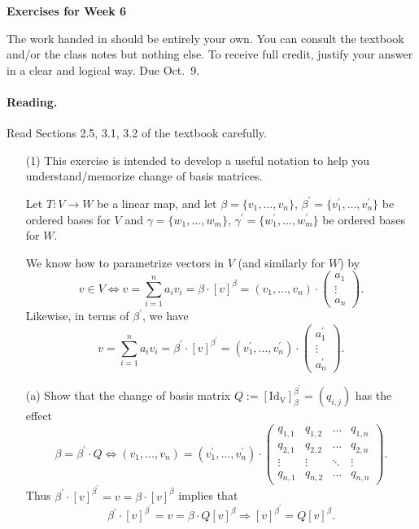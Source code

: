 \documentclass[11pt]{article}
\theoremstyle{plain}
\theoremstyle{definition}
\def\lra{\longrightarrow}
\begin{document}
\begin{center}
{\Large \bf Exercises for Week 6}
\end{center}
The work handed in should be entirely your own. You can consult the textbook and/or the class notes but nothing else. To receive full credit, justify your answer in a clear and logical way. Due Oct.~9.

\paragraph{Reading.} Read Sections 2.5, 3.1, 3.2 of the textbook carefully.

\begin{enumerate}
\item[(1)] This exercise is intended to develop a useful notation to help you understand/memorize change of basis matrices.

Let $T:V\lra W$ be a linear map, and let $\beta=\{v_1,\dots, v_n\}$, $\beta^\prime=\{v_1^\prime,\dots, v_n^\prime\}$ be ordered bases for $V$ and $\gamma=\{w_1,\dots, w_m\}$, $\gamma^\prime=\{w_1^\prime,\dots, w_m^\prime\}$ be ordered bases for $W$.

We know how to parametrize vectors in $V$ (and similarly for $W$) by
\[
v\in V \Longleftrightarrow v=\sum_{i=1}^n a_iv_i = \beta \cdot [v]^{\beta}= (v_1,\dots, v_n) \cdot
\left( 
\begin{matrix}
a_1\\
\vdots\\
a_n
\end{matrix}
\right).
\]
Likewise, in terms of $\beta^\prime$, we have
\[
 v=\sum_{i=1}^n a_iv_i = \beta^\prime \cdot [v]^{\beta^\prime}= (v_1^\prime,\dots, v_n^\prime) \cdot
\left( 
\begin{matrix}
a_1^\prime\\
\vdots\\
a_n^\prime
\end{matrix}
\right).
\]

(a) Show that the change of basis matrix $Q:= [\mathrm{Id_V}]_\beta^{\beta^\prime}=(q_{i,j})$ has the effect
\[
\beta = \beta^\prime\cdot Q \Longleftrightarrow
(v_1,\dots, v_n)= (v_1^\prime,\dots, v_n^\prime) \cdot
\left( 
\begin{matrix}
q_{1,1} & q_{1,2} &\dots & q_{1,n}\\
q_{2,1} & q_{2,2} &\dots & q_{2,n}\\
\vdots & \vdots &\ddots & \vdots\\
q_{n,1} & q_{n,2} &\dots & q_{n,n}
\end{matrix}
\right).
\]
Thus $\beta^\prime \cdot [v]^{\beta^\prime} = v = \beta \cdot [v]^\beta$ implies that
\[
\beta^\prime \cdot [v]^{\beta^\prime} = v = \beta \cdot Q [v]^\beta \Rightarrow   [v]^{\beta^\prime}=  Q [v]^\beta.
\]


\end{enumerate}
\end{document}
